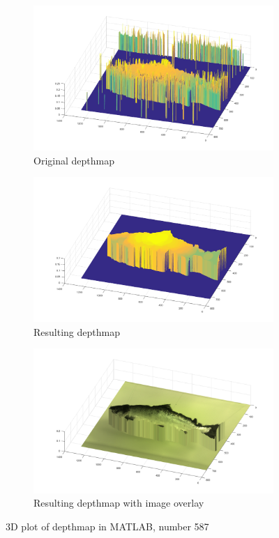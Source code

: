 \begin{figure}[H]
    \centering
    \begin{subfigure}{1\textwidth}
        \centering
        \includegraphics[width=.65\linewidth]{images/results/3D_plots/original_3D_87}
        \caption{Original depthmap} 
        \label{fig:3D_original_87}
    \end{subfigure}\hspace*{\fill}
    
    \medskip
    \begin{subfigure}{1\textwidth}
        \centering
        \includegraphics[width=.65\linewidth]{images/results/3D_plots/fixed_3D_87}
        \caption{Resulting depthmap} 
        \label{fig:3D_fixed_87}
    \end{subfigure}\hspace*{\fill}
    
    \medskip
    \begin{subfigure}{1\textwidth}
        \centering
        \includegraphics[width=.65\linewidth]{images/results/3D_plots/fixed_3D_fish_87}
        \caption{Resulting depthmap with image overlay} 
        \label{fig:3D_fixed_fish_87}
    \end{subfigure}\hspace*{\fill}
    \caption{3D plot of depthmap in MATLAB, number 587}
    \label{fig:3D_plot_87}
\end{figure}




